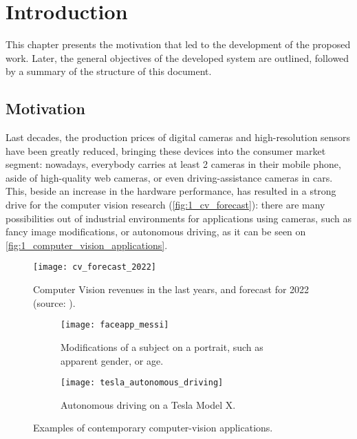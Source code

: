 \chapter{Introduction}
\label{chap:1_introduction}
This chapter presents the motivation that led to the development of the proposed work. Later, the general objectives of the developed system are outlined, followed by a summary of the structure of this document.


\section{Motivation}
\label{sec:1_motivation}
Last decades, the production prices of digital cameras and high-resolution sensors have been greatly reduced, bringing these devices into the consumer market segment: nowadays, everybody carries at least 2 cameras in their mobile phone, aside of high-quality web cameras, or even driving-assistance cameras in cars. This, beside an increase in the hardware performance, has resulted in a strong drive for the computer vision research (\autoref{fig:1_cv_forecast}): there are many possibilities out of industrial environments for applications using cameras, such as fancy image modifications, or autonomous driving, as it can be seen on \autoref{fig:1_computer_vision_applications}.

\begin{figure}[h]
	\centering
	\texttt{[image: cv\_forecast\_2022]}
	\caption{Computer Vision revenues in the last years, and forecast for 2022 (source: \cite{cv_forecast}).}
	\label{fig:1_cv_forecast}
\end{figure}


\begin{figure}[h]
	\centering
	\begin{subfigure}[t]{0.45\linewidth}
		\centering
		\texttt{[image: faceapp\_messi]}
		\caption{Modifications of a subject on a portrait, such as apparent gender, or age.}
	\end{subfigure}
	\begin{subfigure}[t]{0.45\linewidth}
		\centering
		\texttt{[image: tesla\_autonomous\_driving]}
		\caption{Autonomous driving on a Tesla Model X.}
	\end{subfigure}
	\caption{Examples of contemporary computer-vision applications.}
	\label{fig:1_computer_vision_applications}
\end{figure}

